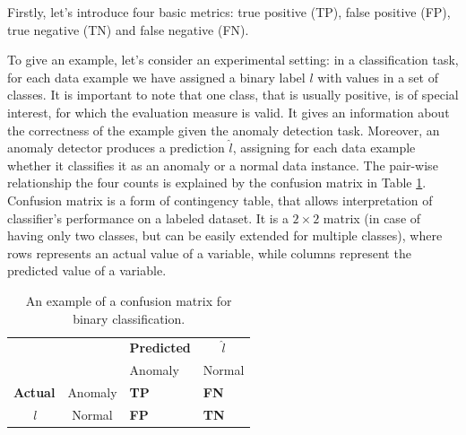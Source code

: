 Firstly, let's introduce four basic metrics: true positive (TP), false positive (FP), true negative (TN) and false negative (FN). 

To give an example, let's consider an experimental setting: in a classification task, for each data example we have assigned a binary label $l$ with values in a set of classes. It is important to note that one class, that is usually positive, is of special interest, for which the evaluation measure is valid. It gives an information about the correctness of the example given the anomaly detection task. Moreover, an anomaly detector produces a prediction $\hat{l}$, assigning for each data example whether it classifies it as an anomaly or a normal data instance. The pair-wise relationship the four counts is explained by the confusion matrix in Table \ref{table:confusionMatrix}. Confusion matrix is a form of contingency table, that allows interpretation of classifier's performance on a labeled dataset. It is a $2 \times 2$ matrix (in case of having only two classes, but can be easily extended for multiple classes), where rows represents an actual value of a variable, while columns represent the predicted value of a variable.

\begin{table}[!h]
\centering
\begin{tabular}{cccc}
\multicolumn{1}{r}{}                 &                              & \textbf{Predicted}          &   $\hat{l}$                          \\ \cline{3-4} 
                                     & \multicolumn{1}{l|}{}        & \multicolumn{1}{l|}{Anomaly} & \multicolumn{1}{l|}{Normal} \\ \cline{2-4} 
                                      
\multicolumn{1}{l|}{\textbf{Actual}} & \multicolumn{1}{l|}{Anomaly}  & \multicolumn{1}{l|}{\textcolor{customBlue}{\textbf{TP}}}     & \multicolumn{1}{l|}{\textcolor{customRed}{\textbf{FN}}}      \\ \cline{2-4} 
\multicolumn{1}{c|}{\textit{l}}                & \multicolumn{1}{c|}{Normal} & \multicolumn{1}{l|}{\textcolor{customDarkRed}{\textbf{FP}}}     & \multicolumn{1}{l|}{\textcolor{customGreen}{\textbf{TN}}}     \\ \cline{2-4} 
\end{tabular}
\caption{An example of a confusion matrix for binary classification.}
\label{table:confusionMatrix}
\end{table}
 
